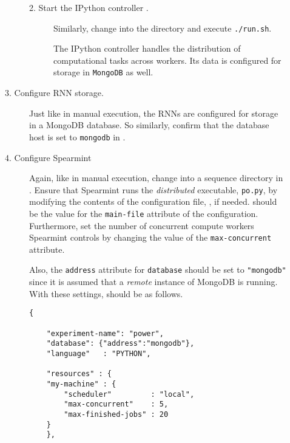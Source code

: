 \begin{description}
\begin{description}
\begin{description}
  \item[2. Start the \textsf{IPython} controller%
    \protect\footnotemark%
.] \hfill
{}%

    Similarly, change into the  directory and execute \texttt{./run.sh}.

    The \textsf{IPython} controller handles the distribution of computational tasks across workers.
    Its data is configured for storage in \texttt{MongoDB} as well.

  \end{description}


\item[3. Configure RNN storage.] \hfill
  
  Just like in manual execution, the RNNs are configured for storage in a \textsf{MongoDB} database.
  So similarly, confirm that the database host is set to \texttt{mongodb} in .


\item[4. Configure \textsf{Spearmint}] \hfill
    
  Again, like in manual execution, change into a sequence directory in .
  Ensure that \textsf{Spearmint} runs the \emph{distributed} executable, \texttt{po.py}, by modifying the contents of the configuration file, , if needed.
     should be the value for the \texttt{main-file} attribute of the configuration.
    Furthermore, set the number of concurrent compute workers \textsf{Spearmint} controls by changing the value of the \texttt{max-concurrent} attribute.


    Also, the \texttt{address} attribute for \texttt{database} should be set to \texttt{"mongodb"} since it is assumed that a \emph{remote} instance of \textsf{MongoDB} is running.
    With these settings,  should be as follows.

\begin{verbatim}
{

    "experiment-name": "power",
    "database": {"address":"mongodb"},
    "language"   : "PYTHON",
    
    "resources" : {
	"my-machine" : {
	    "scheduler"         : "local",
	    "max-concurrent"    : 5,
	    "max-finished-jobs" : 20
	}
    },


\end{verbatim}
\end{description}
\end{description}
